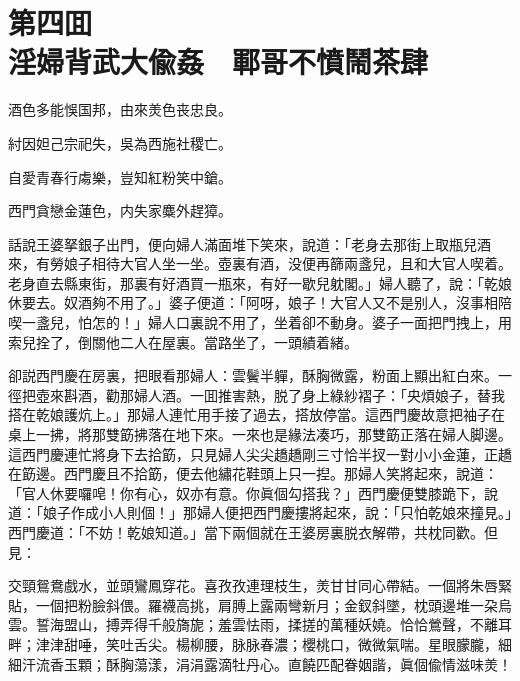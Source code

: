 
\chapter*{第四囬　\\淫婦背武大偸姦　鄆哥不憤鬧茶肆}


\begin{myquote}
酒色多能悞国邦，由來羙色丧忠良。

紂因妲己宗祀失，吳為西施社稷亡。

自愛青春行䖏樂，豈知紅粉笑中鎗。

西門貪戀金蓮色，内失家麋外趕獐。
\end{myquote}

話說王婆拏銀子出門，便向婦人滿面堆下笑來，說道：「老身去那街上取瓶兒酒來，有勞娘子相待大官人坐一坐。壺裏有酒，没便再篩兩盞兒，且和大官人喫着。老身直去縣東街，那裏有好酒買一瓶來，有好一歇兒躭閣。」婦人聽了，說：「乾娘休要去。奴酒夠不用了。」婆子便道：「阿呀，娘子！大官人又不是别人，沒事相陪喫一盞兒，怕怎的！」婦人口裏說不用了，坐着卻不動身。婆子一面把門拽上，用索兒拴了，倒關他二人在屋裏。當路坐了，一頭績着緒。

卻説西門慶在房裏，把眼看那婦人：雲鬢半軃，酥胸微露，粉面上顯出紅白來。一徑把壺來斟酒，勸那婦人酒。一囬推害熱，脱了身上綠紗褶子：「央煩娘子，替我搭在乾娘護炕上。」那婦人連忙用手接了過去，搭放停當。這西門慶故意把袖子在桌上一拂，將那雙筯拂落在地下來。一來也是緣法凑巧，那雙筯正落在婦人脚邊。這西門慶連忙將身下去拾筯，只見婦人尖尖趫趫剛三寸恰半扠一對小小金蓮，正趫在筯邊。西門慶且不拾筯，便去他繡花鞋頭上只一揑。那婦人笑將起來，說道：「官人休要囉唣！你有心，奴亦有意。你眞個勾搭我？」西門慶便雙膝跪下，說道：「娘子作成小人則個！」那婦人便把西門慶摟將起來，說：「只怕乾娘來撞見。」西門慶道：「不妨！乾娘知道。」當下兩個就在王婆房裏脱衣解帶，共枕同歡。但見：

\begin{myquote}
交頸鴛鴦戲水，並頭鸞鳳穿花。喜孜孜連理枝生，羙甘甘同心帶結。一個將朱唇緊貼，一個把粉臉斜偎。羅襪高挑，肩膊上露兩彎新月；金釵斜墜，枕頭邊堆一朶烏雲。誓海盟山，搏弄得千般旖旎；羞雲怯雨，揉搓的萬種妖嬈。恰恰鶯聲，不離耳畔；津津甜唾，笑吐舌尖。楊柳腰，脉脉春濃；櫻桃口，微微氣喘。星眼朦朧，細細汗流香玉顆；酥胸蕩漾，涓涓露滴牡丹心。直饒匹配眷姻諧，眞個偸情滋味羙！
\end{myquote}

